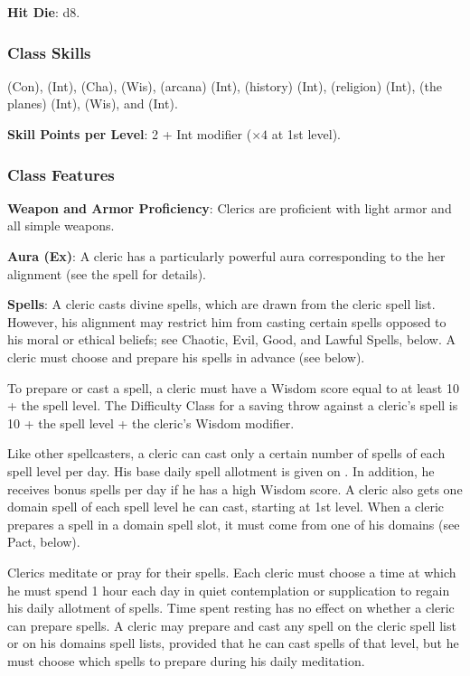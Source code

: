 \textbf{Hit Die}: d8.

\subsubsection{Class Skills}
 (Con),  (Int),  (Cha),  (Wis),  (arcana) (Int),  (history) (Int),  (religion) (Int),  (the planes) (Int),  (Wis), and  (Int).

\textbf{Skill Points per Level}: 2 + Int modifier ($\times4$ at 1st level).

\subsubsection{Class Features}
\textbf{Weapon and Armor Proficiency}: Clerics are proficient with light armor and all simple weapons.

\textbf{Aura (Ex)}: A cleric has a particularly powerful aura corresponding to the her alignment (see the  spell for details).

\textbf{Spells}: A cleric casts divine spells, which are drawn from the cleric spell list. However, his alignment may restrict him from casting certain spells opposed to his moral or ethical beliefs; see Chaotic, Evil, Good, and Lawful Spells, below. A cleric must choose and prepare his spells in advance (see below).

To prepare or cast a spell, a cleric must have a Wisdom score equal to at least 10 + the spell level. The Difficulty Class for a saving throw against a cleric's spell is 10 + the spell level + the cleric's Wisdom modifier.

Like other spellcasters, a cleric can cast only a certain number of spells of each spell level per day. His base daily spell allotment is given on . In addition, he receives bonus spells per day if he has a high Wisdom score. A cleric also gets one domain spell of each spell level he can cast, starting at 1st level. When a cleric prepares a spell in a domain spell slot, it must come from one of his domains (see Pact, below).

Clerics meditate or pray for their spells. Each cleric must choose a time at which he must spend 1 hour each day in quiet contemplation or supplication to regain his daily allotment of spells. Time spent resting has no effect on whether a cleric can prepare spells. A cleric may prepare and cast any spell on the cleric spell list or on his domains spell lists, provided that he can cast spells of that level, but he must choose which spells to prepare during his daily meditation.

